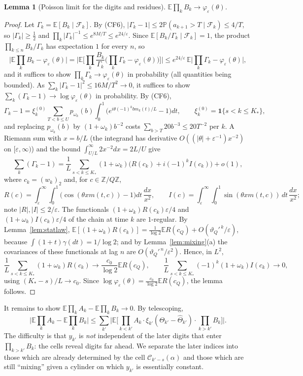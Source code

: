 \documentclass[11pt]{amsart}
\newtheorem{lemma}[theorem]{Lemma}
\theoremstyle{definition}
\numberwithin{equation}{section}
\newcommand{\Z}{\mathbb{Z}}
\newcommand{\E}{\mathbb{E}}
\newcommand{\Prob}{\mathbb{P}}
\newcommand{\cC}{\mathcal{C}}
\newcommand{\cF}{\mathcal{F}}
\newcommand{\eps}{\varepsilon}
\newcommand{\ind}{\mathbf{1}}
\begin{document}
\begin{lemma}[Poisson limit for the digits and residues]\label{lem:poisson}
$\E\prod_kB_k\to\varphi_\eps(\theta)$.
\end{lemma}

\begin{proof}
Let $\Gamma_k=\E[B_k\mid\cF_k]$. By (CF6), $|\Gamma_k-1|\le2\Prob(a_{k+1}>T\mid\cF_k)\le4/T$, so $|\Gamma_k|\ge\frac12$ and
$\prod_k|\Gamma_k|^{-1}\le e^{8M/T}\le e^{24/\eps}$. Since $\E[B_k/\Gamma_k\mid\cF_k]=1$, the product $\prod_{k\le n}B_k/\Gamma_k$ has expectation $1$ for every $n$, so
\[
\Big|\E\prod_kB_k-\varphi_\eps(\theta)\Big|=\Big|\E\Big[\prod_k\frac{B_k}{\Gamma_k}\Big(\prod_k\Gamma_k-\varphi_\eps(\theta)\Big)\Big]\Big|\le e^{24/\eps}\,\E\Big|\prod_k\Gamma_k-\varphi_\eps(\theta)\Big| ,
\]
and it suffices to show $\prod_k\Gamma_k\to\varphi_\eps(\theta)$ in probability (all quantities being bounded). As $\sum_k|\Gamma_k-1|^2\le16M/T^2\to0$, it suffices
to show $\sum_k(\Gamma_k-1)\to\log\varphi_\eps(\theta)$ in probability. By (CF6),
\[
\Gamma_k-1=\xi^{(0)}_k\sum_{T<b\le U}p_{\omega_k}(b)\int_0^1\big(e^{i\theta(-1)^kbm_k(t)/L}-1\big)dt,\qquad \xi^{(0)}_k=\ind\{s<k\le K_*\},
\]
and replacing $p_{\omega_k}(b)$ by $(1+\omega_k)b^{-2}$ costs $\sum_{b>T}20b^{-3}\le20T^{-2}$ per $k$. A Riemann sum with $x=b/L$ (the integrand has
derivative $O((|\theta|+\eps^{-1})x^{-2})$ on $[\eps,\infty)$) and the bound $\int_{U/L}^\infty2x^{-2}dx=2L/U$ give
\[
\sum_k(\Gamma_k-1)=\frac1L\sum_{s<k\le K_*}(1+\omega_k)\Big(R(c_k)+i(-1)^kI(c_k)\Big)+o(1),
\]
where $c_k=(w_k)_2$ and, for $c\in\Z/Q\Z$,
\[
R(c)=\int_\eps^\infty\!\!\int_0^1\big(\cos(\theta xm(t,c))-1\big)dt\,\frac{dx}{x^2},\qquad I(c)=\int_\eps^\infty\!\!\int_0^1\sin(\theta xm(t,c))\,dt\,\frac{dx}{x^2};
\]
note $|R|,|I|\le2/\eps$.
The functionals $(1+\omega_k)R(c_k)\eps/4$ and $(1+\omega_k)I(c_k)\eps/4$ of the chain at time $k$ are $1$-regular. By Lemma~\ref{lem:statlaw},
$\E[(1+\omega_k)R(c_k)]=\frac1{\log2}\E R(c_Q)+O(\vartheta_Q'^{\,k}/\eps)$, because $\int(1+t)\gamma(dt)=1/\log2$; and by Lemma~\ref{lem:mixing}(a) the covariances
of these functionals at lag $n$ are $O(\vartheta_Q'^{\,n}/\eps^2)$. Hence, in $L^2$,
\[
\frac1L\sum_{s<k\le K_*}(1+\omega_k)R(c_k)\to\frac{c_0}{\log2}\E R(c_Q),\qquad \frac1L\sum_{s<k\le K_*}(-1)^k(1+\omega_k)I(c_k)\to0,
\]
using $(K_*-s)/L\to c_0$. Since $\log\varphi_\eps(\theta)=\frac{c_0}{\log2}\E R(c_Q)$, the lemma follows.
\end{proof}

It remains to show $\E\prod_kA_k-\E\prod_kB_k\to0$. By telescoping,
\begin{equation}\label{eq:telescope}
\Big|\E\prod_kA_k-\E\prod_kB_k\Big|\le\sum_{k'}\Big|\E\Big[\prod_{k<k'}A_k\cdot\xi_{k'}(\Theta_{k'}-\hat\Theta_{k'})\cdot\prod_{k>k'}B_k\Big]\Big|.
\end{equation}
The difficulty is that $y_{k'}$ is \emph{not} independent of the later digits that enter $\prod_{k>k'}B_k$: the cells reveal digits
far ahead. We separate the later indices into those which are already determined by the cell $\cC_{k'-s}(\alpha)$ and those which are still
``mixing'' given a cylinder on which $y_{k'}$ is essentially constant.
\end{document}
